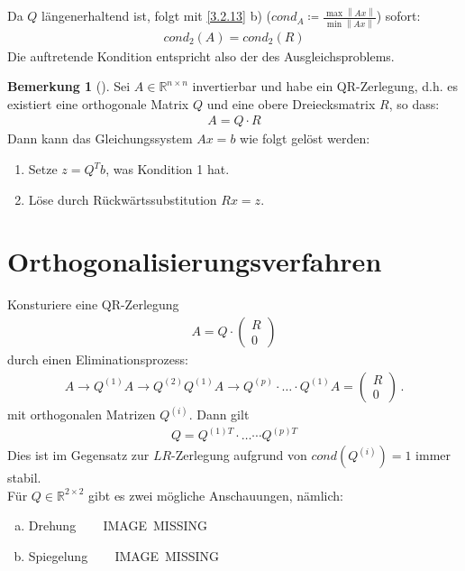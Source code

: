 \documentclass[ngerman,fontsize=11pt, paper=a4, parskip=half, titlepage=true, toc=bib]{scrbook}
\theoremstyle{definition}
\newtheorem{Bem}[Def]{Bemerkung}	%
\theoremstyle{plain}
\newcommand{\R}{\mathds{R}}
\newcommand{\Renn}{\mathds{R}^{n\times n}}
\newcommand{\nn}[1]{\left\| #1 \right\|}
\newcommand{\sectione}[1]{ \setcounter{equation}{0}\section{#1}}
\newcommand{\subsectione}[1]{\addtocounter{Def}{1}\subsection{#1}}
\newenvironment{Beme}[1][]{ %
	\begin{Bem}[#1]
	}
	{
	\end{Bem}
	\addtocounter{subsection}{1}
}
\begin{document}
  Da $Q$ längenerhaltend ist, folgt mit \ref{3.2.13} b)
  ($cond_A \coloneqq \frac{\max \nn{Ax}}{\min \nn{Ax}}$)
  sofort:
  \begin{gather*}
    cond_2(A) = cond_2(R)
  \end{gather*}
  Die auftretende Kondition entspricht also der des Ausgleichsproblems.
  
  
\begin{Beme}
	Sei $A\in \Renn$ invertierbar und habe ein QR-Zerlegung, d.h. es existiert
	eine orthogonale Matrix $Q$ und eine obere Dreiecksmatrix $R$, so dass:
	\begin{gather*}
	A= Q\cdot R
	\end{gather*}
	Dann kann das Gleichungssystem $Ax=b$ wie folgt gelöst werden:
	\begin{enumerate}[1.]
		\item Setze $z=Q^Tb$, was Kondition 1 hat.
		\item Löse durch Rückwärtssubstitution $Rx=z$.
	\end{enumerate}
\end{Beme}
  


  \sectione{Orthogonalisierungsverfahren}		
  Konsturiere eine QR-Zerlegung
  \begin{gather}
    A= Q\cdot \begin{pmatrix} R\\0 \end{pmatrix}
    \label{IV.4.1}
  \end{gather}
  durch einen Eliminationsprozess:
  \begin{gather}
    A \rightarrow Q^{(1)}A \rightarrow Q^{(2)} Q^{(1)}A \rightarrow Q^{(p)}\cdot \dotsc \cdot Q^{(1)}A
    = \begin{pmatrix} R\\0 \end{pmatrix}\, .
    \label{IV.4.2}
  \end{gather}
  mit orthogonalen Matrizen $Q^{(i)}$.
  Dann gilt
  \begin{gather}
    Q= Q^{(1)T}\cdot \dotsc \cdots {Q^{(p)T}}
    \label{IV.4.3}
  \end{gather}
  Dies ist im Gegensatz zur $LR$-Zerlegung aufgrund von $cond(Q^{(i)})= 1$ immer stabil.\\
  
  Für $Q\in\R^{2\times 2}$ gibt es zwei mögliche Anschauungen, nämlich:
  \begin{enumerate}[a)]
  \item Drehung ~~~ IMAGE~MISSING
  \item Spiegelung ~~~ IMAGE~MISSING
  \end{enumerate}
  
\end{document}
